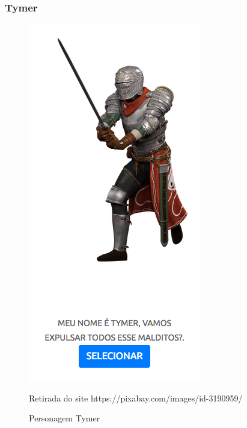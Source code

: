 \subsubsection{Tymer}
\begin{figure}[h]
	\centering
	\includegraphics[keepaspectratio=true,scale=0.6]{figuras/tymer.png}
	\caption{Personagem Tymer}
	Retirada do site https://pixabay.com/images/id-3190959/
	\label{tymer}
\end{figure}
\clearpage
